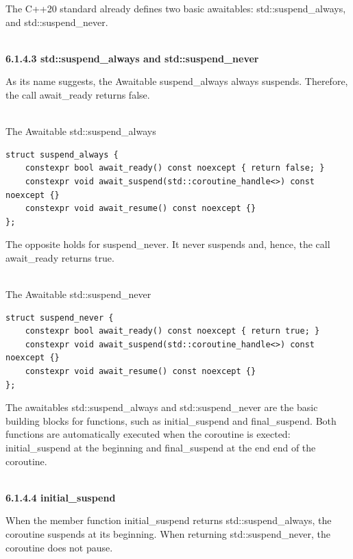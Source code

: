 The C++20 standard already defines two basic awaitables: std::suspend\_always, and std::suspend\_never.

\hspace*{\fill} \\ %
\noindent
\textbf{6.1.4.3\hspace{0.2cm} std::suspend\_always and std::suspend\_never}

As its name suggests, the Awaitable suspend\_always always suspends. Therefore, the call await\_ready returns false.

\hspace*{\fill} \\ %
\noindent
The Awaitable std::suspend\_always
\begin{lstlisting}[style=styleCXX]
struct suspend_always {
	constexpr bool await_ready() const noexcept { return false; }
	constexpr void await_suspend(std::coroutine_handle<>) const noexcept {}
	constexpr void await_resume() const noexcept {}
};
\end{lstlisting}

The opposite holds for suspend\_never. It never suspends and, hence, the call await\_ready returns
true.

\hspace*{\fill} \\ %
\noindent
The Awaitable std::suspend\_never
\begin{lstlisting}[style=styleCXX]
struct suspend_never {
	constexpr bool await_ready() const noexcept { return true; }
	constexpr void await_suspend(std::coroutine_handle<>) const noexcept {}
	constexpr void await_resume() const noexcept {}
};
\end{lstlisting}

The awaitables std::suspend\_always and std::suspend\_never are the basic building blocks for functions, such as initial\_suspend and final\_suspend. Both functions are automatically executed when the coroutine is exected: initial\_suspend at the beginning and final\_suspend at the end end of the coroutine.

\hspace*{\fill} \\ %
\noindent
\textbf{6.1.4.4\hspace{0.2cm} initial\_suspend}

When the member function initial\_suspend returns std::suspend\_always, the coroutine suspends at its beginning. When returning std::suspend\_never, the coroutine does not pause.

